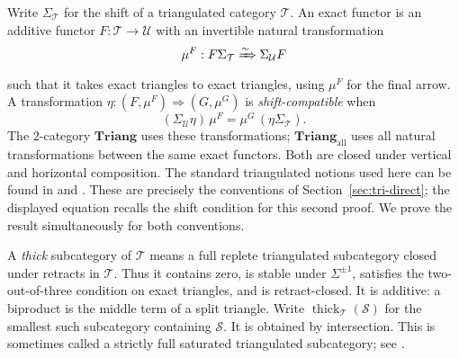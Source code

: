 \documentclass[11pt,reqno,a4paper]{amsart}
\theoremstyle{definition}
\theoremstyle{remark}
\newcommand{\T}{\mathcal{T}}
\newcommand{\U}{\mathcal{U}}
\newcommand{\0}{\mathbf{0}}
\renewcommand{\1}{\mathbf{1}}
\newcommand{\Triang}{\mathbf{Triang}}
\newcommand{\Tri}{\Triang}
\newcommand{\TriAll}{\mathbf{Triang}_{\mathrm{all}}}
\newcommand{\Scl}{\mathcal S}
\DeclareMathOperator{\thick}{thick}
\begin{document}
Write $\Sigma_{\T}$ for the shift of a triangulated category $\T$.
An exact functor is an additive functor $F:\T\to\U$ with an
invertible natural transformation
\[
 \mu^F:F\Sigma_{\T}\xRightarrow{\sim}\Sigma_{\U}F
\]
such that it takes exact triangles to exact triangles,
using $\mu^F$ for the final arrow. A transformation
$\eta:(F,\mu^F)\Rightarrow(G,\mu^G)$ is
\emph{shift-compatible} when
\begin{equation}\label{eq:exactNat}
 (\Sigma_{\U}\eta)\,\mu^F
   =\mu^G\,(\eta\Sigma_{\T}).
\end{equation}
The 2-category $\Tri$ uses these transformations; $\TriAll$ uses
all natural transformations between the same exact functors.
Both are closed under vertical and horizontal composition. The standard
triangulated notions used here can be found in \cite{Verdier} and
\cite{StacksTri}. These are precisely the conventions of Section~\ref{sec:tri-direct};
the displayed equation recalls the shift condition for this second proof.
We prove the result simultaneously for both conventions.

A \emph{thick} subcategory of $\T$ means a full replete triangulated
subcategory closed under retracts in $\T$. Thus it contains zero,
is stable under $\Sigma^{\pm1}$, satisfies the two-out-of-three
condition on exact triangles, and is retract-closed.
It is additive: a biproduct is the middle term of a split triangle.
Write $\thick_{\T}(\Scl)$ for the smallest such subcategory containing
$\Scl$. It is obtained by intersection. This is sometimes called a
strictly full saturated triangulated subcategory; see
\cite[Section 13.6]{StacksTri}.
\end{document}
